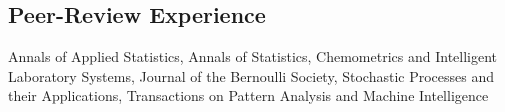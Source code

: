 \documentclass[overlapped,line,letterpaper]{res}
\begin{document}
\begin{resume}

\section{\bf Peer-Review Experience}

Annals of Applied Statistics,
Annals of Statistics,
Chemometrics and Intelligent Laboratory Systems,
Journal of the Bernoulli Society,
Stochastic Processes and their Applications,
Transactions on Pattern Analysis and Machine Intelligence



%


%



\end{resume}
\end{document}
